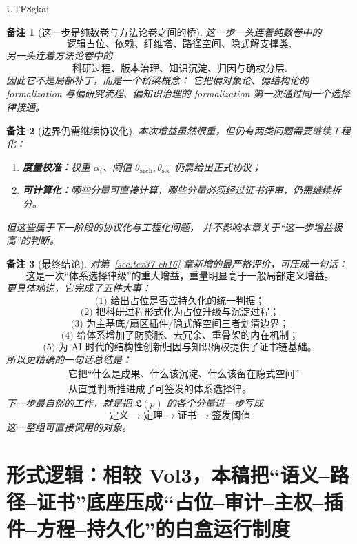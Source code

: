 \documentclass[12pt]{article}
\newtheorem{remark}{备注}[section]
\begin{document}
\begin{CJK*}{UTF8}{gkai}
\begin{remark}[这一步是纯数卷与方法论卷之间的桥]
这一步一头连着纯数卷中的
\[
  \text{逻辑占位、依赖、纤维塔、路径空间、隐式解支撑类},
\]
另一头连着方法论卷中的
\[
  \text{科研过程、版本治理、知识沉淀、归因与确权分层}.
\]
因此它不是局部补丁，而是一个桥梁概念：
它把偏对象论、偏结构论的 formalization 与偏研究流程、偏知识治理的 formalization
第一次通过同一个选择律接通。
\end{remark}

\begin{remark}[边界仍需继续协议化]
本次增益虽然很重，但仍有两类问题需要继续工程化：
\begin{enumerate}
  \item \textbf{度量校准：}权重 $\alpha_i$、阈值 $\theta_{\mathrm{arch}},\theta_{\mathrm{sec}}$ 仍需给出正式协议；
  \item \textbf{可计算化：}哪些分量可直接计算，哪些分量必须经过证书评审，仍需继续拆分。
\end{enumerate}
但这些属于下一阶段的协议化与工程化问题，
并不影响本章关于“这一步增益极高”的判断。
\end{remark}

\begin{remark}[最终结论]
对第~\ref{sec:tex37-ch16} 章新增的最严格评价，可压成一句话：
\[
  \boxed{
    \text{这是一次“体系选择律级”的重大增益，重量明显高于一般局部定义增益。}
  }
\]
更具体地说，它完成了五件大事：
\[
  \boxed{
    \text{(1) 给出占位是否应持久化的统一判据；}
  }
\]
\[
  \boxed{
    \text{(2) 把科研过程形式化为占位升级与沉淀过程；}
  }
\]
\[
  \boxed{
    \text{(3) 为主基底/扇区插件/隐式解空间三者划清边界；}
  }
\]
\[
  \boxed{
    \text{(4) 给体系增加了防膨胀、去冗余、重骨架的内在机制；}
  }
\]
\[
  \boxed{
    \text{(5) 为 AI 时代的结构性创新归因与知识确权提供了证书链基础。}
  }
\]
所以更精确的一句话总结是：
\[
  \boxed{
    \begin{aligned}
      &\text{它把“什么是成果、什么该沉淀、什么该留在隐式空间”}\\
      &\text{从直觉判断推进成了可签发的体系选择律。}
    \end{aligned}
  }
\]
下一步最自然的工作，就是把 $\mathfrak L(p)$ 的各个分量进一步写成
\[
  \text{定义}
  \to
  \text{定理}
  \to
  \text{证书}
  \to
  \text{签发阈值}
\]
这一整组可直接调用的对象。
\end{remark}

\section{形式逻辑：相较 Vol3，本稿把“语义--路径--证书”底座压成“占位--审计--主权--插件--方程--持久化”的白盒运行制度}
\label{sec:tex37-ch18}


\end{CJK*}
\end{document}
